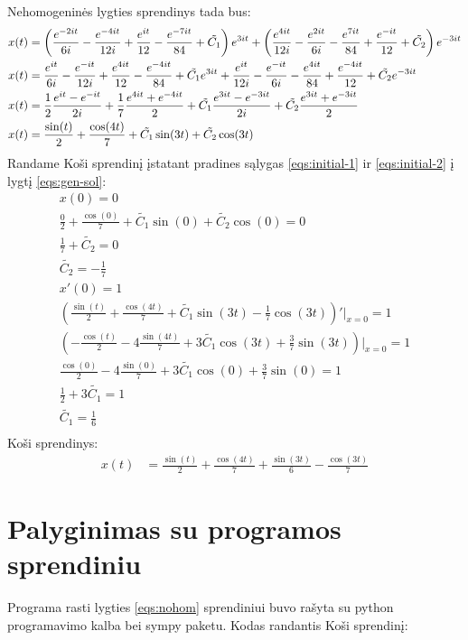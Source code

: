 \documentclass[11pt]{article}
\begin{document}
Nehomogeninės lygties sprendinys tada bus:
\begin{align}
x(t)&=\left(\frac{e^{-2it}}{6i}-\frac{e^{-4it}}{12i}+\frac{e^{it}}{12}-\frac{e^{-7it}}{84}+\tilde{C_1}\right)e^{3it}
+\left(\frac{e^{4it}}{12i}-\frac{e^{2it}}{6i}-\frac{e^{7it}}{84}+\frac{e^{-it}}{12}+\tilde{C_2}\right)e^{-3it}\notag\\
x(t)&=\frac{e^{it}}{6i}-\frac{e^{-it}}{12i}+\frac{e^{4it}}{12}-\frac{e^{-4it}}{84}+\tilde{C_1}e^{3it}
+\frac{e^{it}}{12i}-\frac{e^{-it}}{6i}-\frac{e^{4it}}{84}+\frac{e^{-4it}}{12}+\tilde{C_2}e^{-3it}\notag\\
x(t)&=\frac{1}{2}\frac{e^{it}-e^{-it}}{2i}+\frac{1}{7}\frac{e^{4it}+e^{-4it}}{2}+\tilde{C_1}\frac{e^{3it}-e^{-3it}}{2i}+\tilde{C_2}\frac{e^{3it}+e^{-3it}}{2}\notag\\
x(t)&=\frac{\sin(t)}{2}+\frac{\cos(4t)}{7}+\tilde{C_1}\sin(3t)+\tilde{C_2}\cos(3t)\label{eqs:gen-sol}
\end{align}
Randame Koši sprendinį įstatant pradines sąlygas \eqref{eqs:initial-1} ir \eqref{eqs:initial-2} į lygtį \eqref{eqs:gen-sol}:
\begin{align*}
x(0)=0\\
\frac{0}{2}+\frac{\cos(0)}{7}+\tilde{C_1}\sin(0)+\tilde{C_2}\cos(0)=0\\
\frac{1}{7}+\tilde{C_2}=0\\
\tilde{C_2}=-\frac{1}{7}\\
x'(0)=1\\
\left(\frac{\sin(t)}{2}+\frac{\cos(4t)}{7}+\tilde{C_1}\sin(3t)-\frac{1}{7}\cos(3t)\right)'\Big\vert_{x=0}=1\\
\left(-\frac{\cos(t)}{2}-4\frac{\sin(4t)}{7}+3\tilde{C_1}\cos(3t)+\frac{3}{7}\sin(3t)\right)\Big\vert_{x=0}=1\\
\frac{\cos(0)}{2}-4\frac{\sin(0)}{7}+3\tilde{C_1}\cos(0)+\frac{3}{7}\sin(0)=1\\
\frac{1}{2}+3\tilde{C_1}=1\\
\tilde{C_1}=\frac{1}{6}\\
\end{align*}
Koši sprendinys:
\begin{align}
x(t)&=\frac{\sin(t)}{2}+\frac{\cos(4t)}{7}+\frac{\sin(3t)}{6}-\frac{\cos(3t)}{7}
\end{align}
\section{Palyginimas su programos sprendiniu}

Programa rasti lygties \eqref{eqs:nohom} sprendiniui buvo rašyta su python programavimo
kalba bei sympy paketu. Kodas randantis Koši sprendinį:
\end{document}
